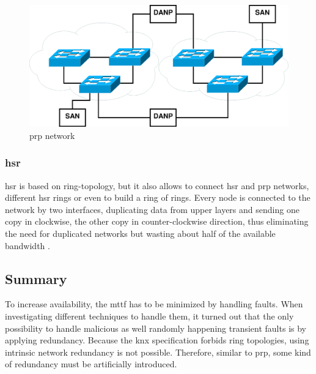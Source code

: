 \begin{figure}
    \centering
    \includegraphics[width=1\textwidth]{figures/prp.eps}
    \caption{\gls{prp} network}
    \label{fig:prp}
\end{figure}

\subsubsection{\gls{hsr}}
\gls{hsr} is based on ring-topology, but it also allows to connect \gls{hsr} and \gls{prp} networks, different \gls{hsr} rings or even to build a ring of rings. 
Every node is connected to the network by two interfaces, duplicating data from upper layers and sending one copy in clockwise, the other copy in counter-clockwise direction,
thus eliminating the need for duplicated networks but wasting about half of the available bandwidth \cite{6174793}. 

\subsection{Summary}
To increase availability, the \gls{mttf} has to be minimized by handling faults.
When investigating different techniques to handle them, it turned out that the only possibility to handle malicious as well randomly happening transient faults is by applying
redundancy. Because the \gls{knx} specification forbids ring topologies, using intrinsic network redundancy is not possible. Therefore, similar to \gls{prp},
some kind of redundancy must be artificially introduced.


